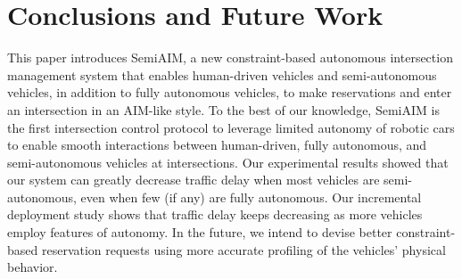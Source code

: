 \section{Conclusions and Future Work}
\label{sec:conclusions}

This paper introduces SemiAIM, a new constraint-based autonomous
intersection management system that enables human-driven vehicles and
semi-autonomous vehicles, in addition to fully autonomous vehicles, to
make reservations and enter an intersection in an AIM-like style. To
the best of our knowledge, SemiAIM is the first intersection control
protocol to leverage limited autonomy of robotic cars to enable smooth
interactions between human-driven, fully autonomous, and
semi-autonomous vehicles at intersections. Our experimental results
showed that our system can greatly decrease traffic delay when most
vehicles are semi-autonomous, even when few (if any) are fully
autonomous. Our incremental deployment study shows that traffic delay
keeps decreasing as more vehicles employ features of autonomy.  In the
future, we intend to devise better constraint-based reservation
requests using more accurate profiling of the vehicles' physical
behavior.














